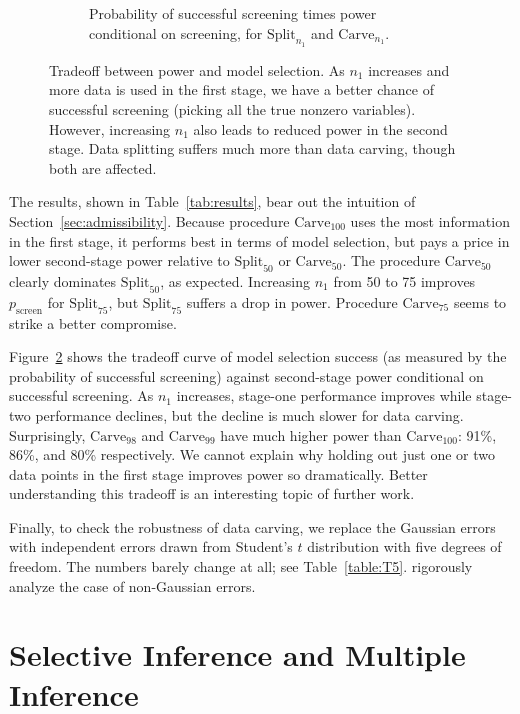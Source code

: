 \documentclass{article}
\theoremstyle{definition}
\newcommand{\sampOrData}{data }
\begin{document}
\begin{figure}
\begin{subfigure}[t]{.4\textwidth}
    \caption{Probability of successful screening times power conditional on screening, for $\text{Split}_{n_1}$ and $\text{Carve}_{n_1}$.}
    \label{fig:lassoTRADE2}
  \end{subfigure}
  \caption{Tradeoff between power and model selection.
As $n_1$ increases and more data is used in the first stage, we have a better chance of successful screening (picking all the true nonzero variables). However, increasing $n_1$ also leads to reduced power in the second stage. Data splitting suffers much more than data carving, though both are affected.}
  \label{fig:lassoTRADEOFF}
\end{figure}


The results, shown in Table~\ref{tab:results}, bear out the intuition of Section~\ref{sec:admissibility}.
Because procedure $\text{Carve}_{100}$ uses the most information in the first stage, it performs best in terms of model selection, but pays a price in lower second-stage power relative to $\text{Split}_{50}$ or $\text{Carve}_{50}$. The procedure $\text{Carve}_{50}$ clearly dominates $\text{Split}_{50}$, as expected. Increasing $n_1$ from 50 to 75 improves $p_{\text{screen}}$ for $\text{Split}_{75}$, but $\text{Split}_{75}$ suffers a drop in power. Procedure $\text{Carve}_{75}$ seems to strike a better compromise.

Figure~\ref{fig:lassoTRADEOFF} shows the tradeoff curve of model selection success (as measured by the probability of successful screening) against second-stage power conditional on successful screening. As $n_1$ increases, stage-one performance improves while stage-two performance declines, but the decline is much slower for \sampOrData carving. Surprisingly, $\text{Carve}_{98}$ and $\text{Carve}_{99}$ have much higher power than $\text{Carve}_{100}$: 91\%, 86\%, and 80\% respectively. We cannot explain why holding out just one or two data points in the first stage improves power so dramatically. Better understanding this tradeoff is an interesting topic of further work.

Finally, to check the robustness of \sampOrData carving, we replace the Gaussian errors with independent errors drawn from Student's $t$ distribution with five degrees of freedom. The numbers barely change at all; see Table~\ref{table:T5}. \citet{tian2015asymptotics} rigorously analyze the case of non-Gaussian errors.


\section{Selective Inference and Multiple Inference}\label{sec:multiple}
\end{document}
